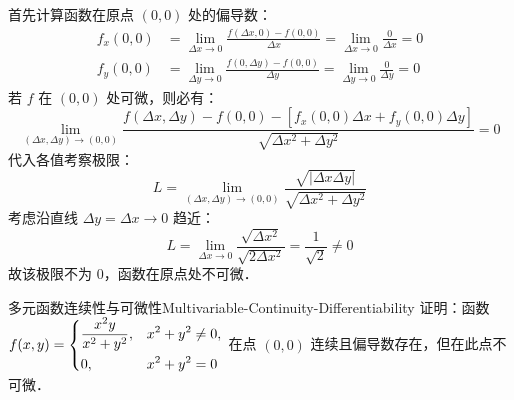 \begin{myproof}
    首先计算函数在原点 $(0,0)$ 处的偏导数：
    \begin{equation}
        \begin{aligned}
            f_x(0,0) & = \lim_{\Delta x \to 0} \frac{f(\Delta x, 0) - f(0,0)}{\Delta x} = \lim_{\Delta x \to 0} \frac{0}{ \Delta x} = 0 \\
            f_y(0,0) & = \lim_{\Delta y \to 0} \frac{f(0, \Delta y) - f(0,0)}{\Delta y} = \lim_{\Delta y \to 0} \frac{0}{ \Delta y} = 0
        \end{aligned}
    \end{equation}
    若 $f$ 在 $(0,0)$ 处可微，则必有：
    \begin{equation}
        \lim_{(\Delta x, \Delta y) \to (0,0)} \frac{f(\Delta x, \Delta y) - f(0,0) - [f_x(0,0)\Delta x + f_y(0,0)\Delta y]}{\sqrt{\Delta x^2 + \Delta y^2}} = 0
    \end{equation}
    代入各值考察极限：
    \begin{equation}
        L = \lim_{(\Delta x, \Delta y) \to (0,0)} \frac{\sqrt{|\Delta x \Delta y|}}{\sqrt{\Delta x^2 + \Delta y^2}}
    \end{equation}
    考虑沿直线 $\Delta y = \Delta x \to 0$ 趋近：
    \begin{equation}
        L = \lim_{\Delta x \to 0} \frac{\sqrt{\Delta x^2}}{\sqrt{2\Delta x^2}} = \frac{1}{\sqrt{2}} \neq 0
    \end{equation}
    故该极限不为 $0$，函数在原点处不可微．
\end{myproof}


\begin{problem}{多元函数连续性与可微性}{Multivariable-Continuity-Differentiability}
    证明：函数 $f(x, y) = \begin{dcases} \frac{x^2 y}{x^2 + y^2}, & x^2 + y^2 \neq 0, \\ 0, & x^2 + y^2 = 0 \end{dcases}$ 在点 $(0, 0)$ 连续且偏导数存在，但在此点不可微．
\end{problem}

